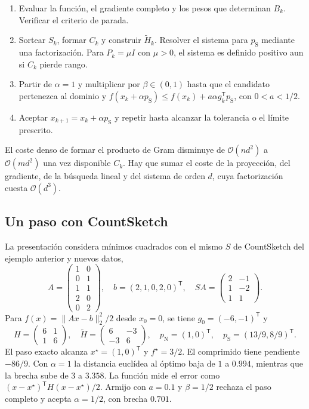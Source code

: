 \documentclass[11pt,a4paper]{article}
\newcommand{\T}{^{\mathsf T}}
\newcommand{\nrm}[1]{\lVert #1\rVert}
\newcommand{\cO}{\mathcal O}
\newcommand{\pN}{p_{\mathrm N}}
\newcommand{\pS}{p_{\mathrm S}}
\newcommand{\HS}{\widetilde H}
\begin{document}
\begin{enumerate}
\item Evaluar la función, el gradiente completo y los pesos que determinan $B_k$. Verificar el criterio de parada.
\item Sortear $S_k$, formar $C_k$ y construir $\HS_k$. Resolver el sistema para $\pS$ mediante una factorización. Para $P_k=\mu I$ con $\mu>0$, el sistema es definido positivo aun si $C_k$ pierde rango.
\item Partir de $\alpha=1$ y multiplicar por $\beta\in(0,1)$ hasta que el candidato pertenezca al dominio y $f(x_k+\alpha\pS)\le f(x_k)+a\alpha g_k\T\pS$, con $0<a<1/2$.
\item Aceptar $x_{k+1}=x_k+\alpha\pS$ y repetir hasta alcanzar la tolerancia o el límite prescrito.
\end{enumerate}
El coste denso de formar el producto de Gram disminuye de $\cO(nd^2)$ a $\cO(md^2)$ una vez disponible $C_k$. Hay que sumar el coste de la proyección, del gradiente, de la búsqueda lineal y del sistema de orden $d$, cuya factorización cuesta $\cO(d^3)$.

\subsection{Un paso con CountSketch}
La presentación considera mínimos cuadrados con el mismo $S$ de CountSketch del ejemplo anterior y nuevos datos,
\[
 A=\begin{pmatrix}1&0\\0&1\\1&1\\2&0\\0&2\end{pmatrix},\quad
 b=(2,1,0,2,0)\T,\quad SA=\begin{pmatrix}2&-1\\1&-2\\1&1\end{pmatrix}.
\]
Para $f(x)=\nrm{Ax-b}_2^2/2$ desde $x_0=0$, se tiene $g_0=(-6,-1)\T$ y
\[
 H=\begin{pmatrix}6&1\\1&6\end{pmatrix},\quad
 \HS=\begin{pmatrix}6&-3\\-3&6\end{pmatrix},\quad
 \pN=(1,0)\T,\quad \pS=(13/9,8/9)\T.
\]
El paso exacto alcanza $x^\star=(1,0)\T$ y $f^\star=3/2$. El comprimido tiene pendiente $-86/9$. Con $\alpha=1$ la distancia euclídea al óptimo baja de $1$ a $0.994$, mientras que la brecha sube de $3$ a $3.358$. La función mide el error como $(x-x^\star)\T H(x-x^\star)/2$. Armijo con $a=0.1$ y $\beta=1/2$ rechaza el paso completo y acepta $\alpha=1/2$, con brecha $0.701$.
\end{document}
